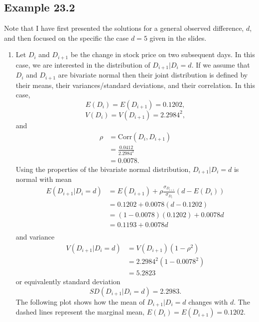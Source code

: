 \documentclass[
  letterpaper,
  DIV=11,
  numbers=noendperiod]{scrartcl}
\providecommand{\tightlist}{%
  \setlength{\itemsep}{0pt}\setlength{\parskip}{0pt}}\usepackage{longtable,booktabs,array}
\begin{document}
\subsection{Example 23.2}\label{example-23.2}

Note that I have first presented the solutions for a general observed
difference, \(d\), and then focused on the specific the case \(d=5\)
given in the slides.

\begin{enumerate}
\def\labelenumi{\alph{enumi})}
\tightlist
\item
  Let \(D_i\) and \(D_{i+1}\) be the change in stock price on two
  subsequent days. In this case, we are interested in the distribution
  of \(D_{i+1}|D_i=d\). If we assume that \(D_i\) and \(D_{i+1}\) are
  bivariate normal then their joint distribution is defined by their
  means, their variances/standard deviations, and their correlation. In
  this case, \[
  E(D_i)=E(D_{i+1})=0.1202,
  \] \[
  V(D_i)=V(D_{i+1})=2.2984^2,
  \] and \[
  \begin{aligned}
  \rho &= \mbox{Corr}(D_i,D_{i+1})\\
  &=\frac{0.0412}{2.2984^2}\\
  &=0.0078.
  \end{aligned}
  \] Using the properties of the bivariate normal distribution,
  \(D_{i+1}|D_i=d\) is normal with mean \[
  \begin{aligned}
  E(D_{i+1}|D_i=d)&=E(D_{i+1}) + \rho \frac{\sigma_{D_{i+1}}}{\sigma_{D_{i}}}(d-E(D_i))\\
  &=0.1202 + 0.0078(d-0.1202)\\
  &=(1-0.0078)(0.1202) + 0.0078d\\
  &=0.1193 + 0.0078d\\
  \end{aligned}
  \] and variance \[
  \begin{aligned}
  V(D_{i+1}|D_i=d)
  &=V(D_{i+1})(1-\rho^2)\\
  &=2.2984^2(1-0.0078^2)\\
  &=5.2823
  \end{aligned}
  \] or equivalently standard deviation \[
  SD(D_{i+1}|D_i=d)=2.2983.
  \] The following plot shows how the mean of \(D_{i+1}|D_i=d\) changes
  with \(d\). The dashed lines represent the marginal mean,
  \(E(D_i)=E(D_{i+1})=0.1202\).
\end{enumerate}
\end{document}

